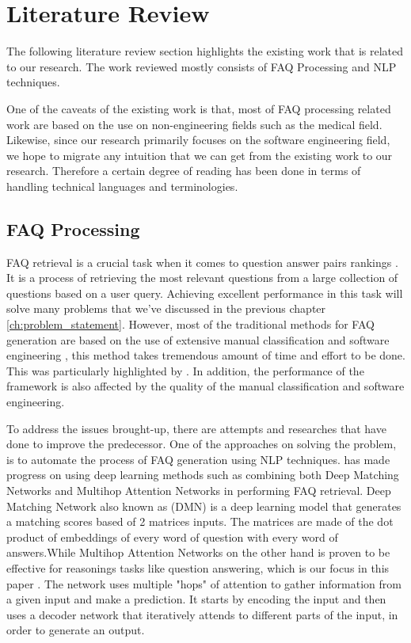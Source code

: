 \chapter{Literature Review}
The following literature review section highlights the existing work that is related to our research. The work reviewed mostly consists of FAQ Processing and NLP techniques.

One of the caveats of the existing work is that, most of FAQ processing related work are based on the use on non-engineering fields such as the medical field. Likewise, since our research primarily focuses on the software engineering field, we hope to migrate any intuition that we can get from the existing work to our research. Therefore a certain degree of reading has been done in terms of handling technical languages and terminologies.

\pagebreak
\section{FAQ Processing}
FAQ retrieval is a crucial task when it comes to question answer pairs rankings \cite{faq_gen_1}. It is a process of retrieving the most relevant questions from a large collection of questions based on a user query. Achieving excellent performance in this task will solve many problems that we've discussed in the previous chapter \ref*{ch:problem_statement}. However, most of the traditional methods for FAQ generation are based on the use of extensive manual classification and software engineering \cite{faq_gen_1}, this method takes tremendous amount of time and effort to be done. This was particularly highlighted by \cite{10.1007/978-3-319-18356-5_30} \cite{5615722} \cite{6227139} \cite{7817112}. In addition, the performance of the framework is also affected by the quality of the manual classification and software engineering.

To address the issues brought-up, there are attempts and researches that have done to improve the predecessor. One of the approaches on solving the problem, is to automate the process of FAQ generation using NLP techniques. \cite{faq_gen_1} has made progress on using deep learning methods such as combining both Deep Matching Networks and Multihop Attention Networks in performing FAQ retrieval. Deep Matching Network also known as (DMN) is a deep learning model that generates a matching scores based of 2 matrices inputs. The matrices are made of the dot product of embeddings of every word of question with every word of answers.While Multihop Attention Networks on the other hand is proven to be effective for reasonings tasks like question answering, which is our focus in this paper \cite{faq_gen_1}. The network uses multiple "hops" of attention to gather information from a given input and make a prediction. It starts by encoding the input and then uses a decoder network that iteratively attends to different parts of the input, in order to generate an output.

